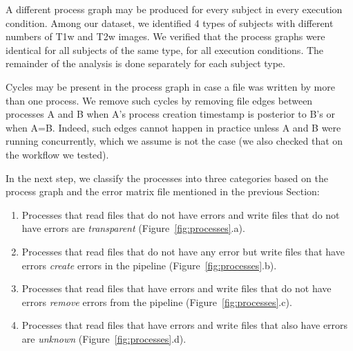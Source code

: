 \documentclass{article}
\begin{document}
{A different process graph may be produced for every subject in every 
execution condition. Among our dataset, we identified 4 types of 
subjects with different numbers of T1w and T2w images. We verified that 
the process graphs were identical for all subjects of the same type, 
for all execution conditions. The remainder of the 
analysis is done separately for each subject type.

Cycles may be present in the process graph in case a file was written 
by more than one process. We remove such cycles by removing file edges 
between processes A and B when A's process creation timestamp is 
posterior to B's or when A=B. Indeed, such edges cannot happen in 
practice unless A and B were running concurrently, which we assume is 
not the case (we also checked that on the workflow we tested). 

In the next step, we classify the processes into three 
categories based on the process graph and the error matrix file 
mentioned in the previous Section:
\begin{enumerate}
\item Processes that read files that do not have errors and write files that do not 
have errors are \emph{transparent} (Figure~\ref{fig:processes}.a).
\item Processes that read files 
that do not have any error but write files that have errors 
\emph{create} errors in the pipeline (Figure~\ref{fig:processes}.b).
\item Processes that read files 
that have errors and write files that do not have errors \emph{remove} 
errors from the pipeline (Figure~\ref{fig:processes}.c).
\item Processes that read files that have errors and write files that also have errors are 
\emph{unknown} (Figure~\ref{fig:processes}.d).
\end{enumerate}

}
\end{document}
